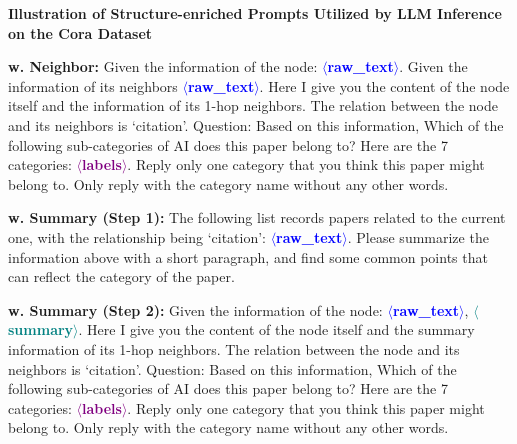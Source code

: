 \begin{tcolorbox}[colback=gray!10, colframe=black, boxrule=1pt, arc=2pt, left=5pt, right=5pt]

\textbf{Illustration of Structure-enriched Prompts Utilized by LLM Inference on the Cora Dataset} \vspace*{5pt}
 \small
 
\textbf{w. Neighbor: }{Given the information of the node: \textcolor{blue}{\textbf{$\langle$raw\_text$\rangle$}}. Given the information of its neighbors \textcolor{blue}{\textbf{$\langle$raw\_text$\rangle$}}.
Here I give you the content of the node itself and the information of its 1-hop neighbors. The relation between the node and its neighbors is `citation'. Question: Based on this information, Which of the following sub-categories of AI does this paper belong to? Here are the 7 categories: \textcolor{purple}{\textbf{$\langle$labels$\rangle$}}. Reply only one category that you think this paper might belong to. Only reply with the category name without any other words. } \vspace*{4pt}

\textbf{w. Summary (Step 1): }{
The following list records papers related to the current one, with the relationship being `citation': \textcolor{blue}{\textbf{$\langle$raw\_text$\rangle$}}. Please summarize the information above with a short paragraph, and find some common points that can reflect the category of the paper.
} \vspace*{2pt}

\textbf{w. Summary (Step 2): }{Given the information of the node: \textcolor{blue}{\textbf{$\langle$raw\_text$\rangle$}}, \textcolor{teal}{\textbf{$\langle$summary$\rangle$}}.
Here I give you the content of the node itself and the summary information of its 1-hop neighbors. The relation between the node and its neighbors is `citation'. Question: Based on this information, Which of the following sub-categories of AI does this paper belong to? Here are the 7 categories: \textcolor{purple}{\textbf{$\langle$labels$\rangle$}}.
 Reply only one category that you think this paper might belong to. Only reply with the category name without any other words. } %

\end{tcolorbox}

\clearpage
\newpage

